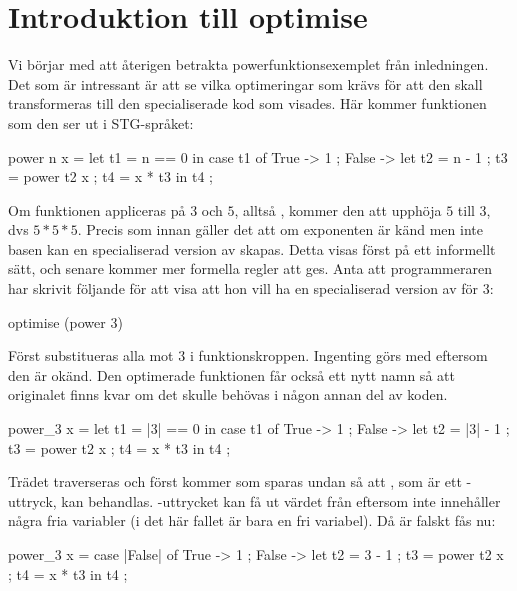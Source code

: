 \documentclass[../Optimise]{subfiles}
\begin{document}
\section{Introduktion till optimise}

Vi börjar med att återigen betrakta powerfunktionsexemplet från inledningen. Det som är
intressant är att se vilka optimeringar som krävs för att den skall transformeras till den
specialiserade kod som visades. Här kommer funktionen som den ser ut i STG-språket:

\begin{codeEx}
power n x = let t1 = n == 0
    in case t1 of
        { True -> 1
        ; False -> let 
            { t2 = n - 1 
            ; t3 = power t2 x
            ; t4 = x * t3
            } in t4
        };
\end{codeEx}

Om funktionen appliceras på $3$ och $5$, alltså , kommer den att upphöja $5$ till $3$, dvs $5 * 5 * 5$.
Precis som innan gäller det att om exponenten är känd men inte basen kan en 
specialiserad version av  skapas. Detta visas först på ett informellt sätt, 
och senare kommer mer formella regler att ges. Anta att programmeraren
har skrivit följande för att visa att hon vill ha en specialiserad version av  för $3$:

\begin{codeEx}
optimise (power 3)
\end{codeEx}

Först substitueras alla  mot $3$ i funktionskroppen. Ingenting görs med 
 eftersom den är okänd. Den optimerade funktionen får också ett nytt namn
så att originalet finns kvar om det skulle behövas i någon annan del av koden.

\begin{codeExDiff}
power_3 x = let t1 = |3| == 0
    in case t1 of
        { True -> 1
        ; False -> let 
            { t2 = |3| - 1 
            ; t3 = power t2 x
            ; t4 = x * t3
            } in t4
        };
\end{codeExDiff}

Trädet traverseras och först kommer  som 
sparas undan så att , som är ett -uttryck, kan behandlas. 
-uttrycket kan få ut värdet från  eftersom  inte innehåller några 
fria variabler (i det här fallet är bara  en fri variabel). Då  är falskt fås nu: 

\begin{codeExDiff}
power_3 x = case |False| of
    { True -> 1
    ; False -> let 
        { t2 = 3 - 1 
        ; t3 = power t2 x
        ; t4 = x * t3
        } in t4
    };
\end{codeExDiff}
\end{document}
